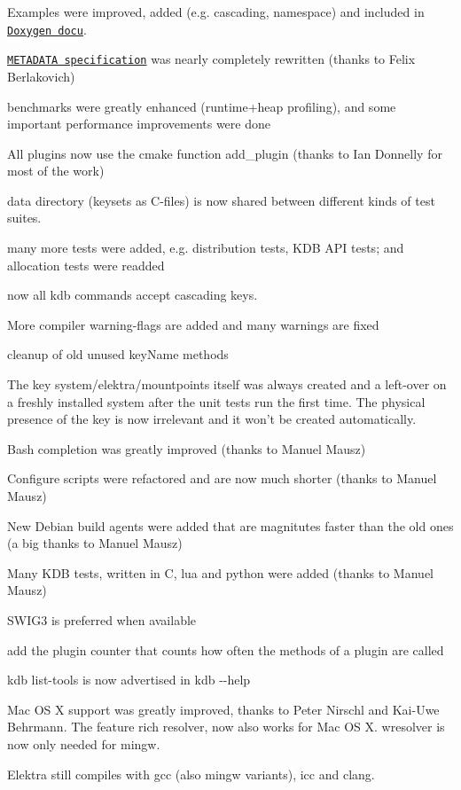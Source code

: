 \begin{DoxyItemize}
\item Examples were improved, added (e.\+g. cascading, namespace) and included in \href{http://doc.libelektra.org/api/0.8.11/html}{\tt Doxygen docu}.
\item \href{https://github.com/ElektraInitiative/libelektra/blob/master/doc/METADATA.ini}{\tt M\+E\+T\+A\+D\+A\+T\+A specification} was nearly completely rewritten (thanks to Felix Berlakovich)
\item benchmarks were greatly enhanced (runtime+heap profiling), and some important performance improvements were done
\item All plugins now use the cmake function {\ttfamily add\+\_\+plugin} (thanks to Ian Donnelly for most of the work)
\item data directory (keysets as C-\/files) is now shared between different kinds of test suites.
\item many more tests were added, e.\+g. distribution tests, K\+D\+B A\+P\+I tests; and allocation tests were readded
\item now all kdb commands accept cascading keys.
\item More compiler warning-\/flags are added and many warnings are fixed
\item cleanup of old unused {\ttfamily key\+Name} methods
\item The key {\ttfamily system/elektra/mountpoints} itself was always created and a left-\/over on a freshly installed system after the unit tests run the first time. The physical presence of the key is now irrelevant and it won't be created automatically.
\item Bash completion was greatly improved (thanks to Manuel Mausz)
\item Configure scripts were refactored and are now much shorter (thanks to Manuel Mausz)
\item New Debian build agents were added that are magnitutes faster than the old ones (a big thanks to Manuel Mausz)
\item Many K\+D\+B tests, written in C, lua and python were added (thanks to Manuel Mausz)
\item S\+W\+I\+G3 is preferred when available
\item add the plugin counter that counts how often the methods of a plugin are called
\item {\ttfamily kdb list-\/tools} is now advertised in {\ttfamily kdb -\/-\/help}
\item Mac O\+S X support was greatly improved, thanks to Peter Nirschl and Kai-\/\+Uwe Behrmann. The feature rich resolver, now also works for Mac O\+S X. wresolver is now only needed for mingw.
\item Elektra still compiles with gcc (also mingw variants), icc and clang.
\end{DoxyItemize}

